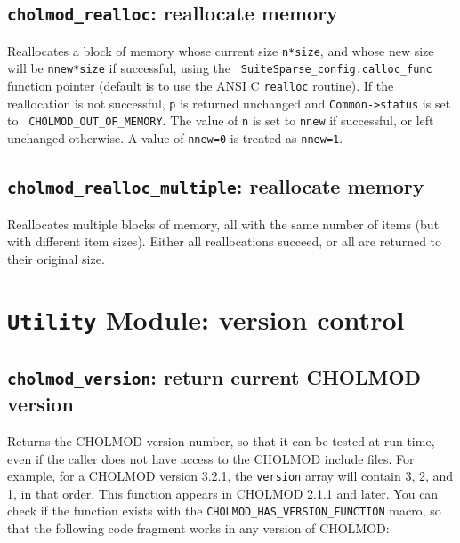 \documentclass[11pt]{article}
\begin{document}
\subsection{{\tt cholmod\_realloc}: reallocate memory}


Reallocates a block of memory whose current size {\tt n*size}, and whose new
size will be {\tt nnew*size} if successful, using the {\tt
SuiteSparse\_config.calloc\_func} function pointer (default is to use the ANSI
C {\tt realloc} routine).  If the reallocation is not successful, {\tt p} is
returned unchanged and {\tt Common->status} is set to {\tt
CHOLMOD\_OUT\_OF\_MEMORY}.  The value of {\tt n} is set to {\tt nnew} if
successful, or left unchanged otherwise.  A value of {\tt nnew=0} is treated as
{\tt nnew=1}.

\subsection{{\tt cholmod\_realloc\_multiple}: reallocate memory}


Reallocates multiple blocks of memory, all with the same number of items (but
with different item sizes).  Either all reallocations succeed, or all are
returned to their original size.

\newpage \section{{\tt Utility} Module: version control}

\subsection{{\tt cholmod\_version}: return current CHOLMOD version}


Returns the CHOLMOD version number, so that it can be tested at run time, even
if the caller does not have access to the CHOLMOD include files.  For example,
for a CHOLMOD version 3.2.1, the {\tt version} array will contain 3, 2, and 1,
in that order.  This function appears in CHOLMOD 2.1.1 and later.  You can
check if the function exists with the {\tt CHOLMOD\_HAS\_VERSION\_FUNCTION}
macro, so that the following code fragment works in any version of CHOLMOD:
\end{document}
